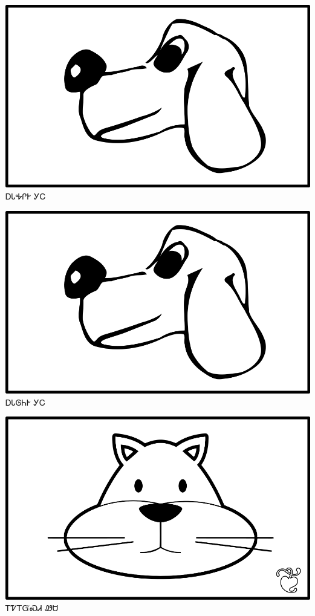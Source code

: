 \documentclass[avery5371]{flashcards}%
\begin{document}
    \begin{flashcard}{
        \includegraphics[width=0.95\columnwidth,height=.51\columnwidth,keepaspectratio]{../artwork/for-colors/gihli}
    }
        \Huge ᎠᏓᎭᎵᎨ ᎩᏟ
    \end{flashcard}

    \begin{flashcard}{
        \includegraphics[width=0.95\columnwidth,height=.51\columnwidth,keepaspectratio]{../artwork/for-colors/gihli}
    }
        \Huge ᎠᏓᎶᏂᎨ ᎩᏟ
    \end{flashcard}

    \begin{flashcard}{
        \includegraphics[width=0.95\columnwidth,height=.51\columnwidth,keepaspectratio]{../artwork/for-colors/wesa-with-leaf}
    }
        \Huge ᎢᏤᎢᏳᏍᏗ ᏪᏌ
    \end{flashcard}
\end{document}
